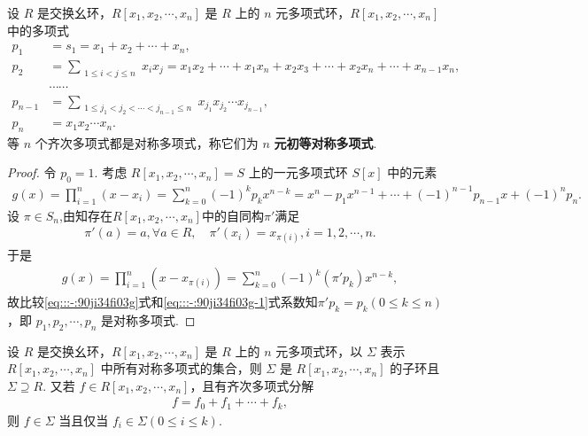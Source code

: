 \documentclass[../../main.tex]{subfiles}%
\begin{document}
\begin{lemma}\label{lemma:抽象代数--引理2.3.1}
设 \( R \) 是交换幺环，\( R[x_1, x_2, \cdots, x_n] \) 是 \( R \) 上的 \( n \) 元多项式环，\( R[x_1, x_2, \cdots, x_n] \) 中的多项式
\begin{align*}
p_1 &= s_1 = x_1 + x_2 + \cdots + x_n, \\
p_2 &= \sum_{\substack{1 \leqslant i < j \leqslant n}} x_i x_j = x_1 x_2 + \cdots + x_1 x_n + x_2 x_3 + \cdots + x_2 x_n + \cdots + x_{n-1} x_n, \\
&\cdots\cdots \\
p_{n-1} &= \sum_{\substack{1 \leqslant j_1 < j_2 < \cdots < j_{n-1} \leqslant n}} x_{j_1} x_{j_2} \cdots x_{j_{n-1}} , \\
p_n &= x_1 x_2 \cdots x_n.
\end{align*}
等 \( n \) 个齐次多项式都是对称多项式，称它们为 \( n \) \textbf{元初等对称多项式}.
\end{lemma}
\begin{proof}
令 \( p_0 = 1 \). 考虑 \( R[x_1, x_2, \cdots, x_n] = S \) 上的一元多项式环 \( S[x] \) 中的元素
\begin{align}\label{eq:::-:90ji34fi03g}
g(x) = \prod_{i=1}^n (x - x_i) = \sum_{k=0}^n (-1)^k p_k x^{n - k} = x^n - p_1 x^{n - 1} + \cdots + (-1)^{n - 1} p_{n - 1} x + (-1)^n p_n.
\end{align}
设 \( \pi \in S_n \),由知存在$R[x_1,x_2,\cdots,x_n]$中的自同构$\pi'$满足
\begin{align*}
\pi'(a) = a, \forall a \in R, \quad \pi'(x_i) = x_{\pi(i)}, i = 1, 2, \cdots, n.
\end{align*}
于是
\begin{align}\label{eq:::-:90ji34fi03g-1}
g(x) = \prod_{i=1}^n (x - x_{\pi(i)}) = \sum_{k=0}^n (-1)^k (\pi' p_k) x^{n - k},
\end{align}
故比较\eqref{eq:::-:90ji34fi03g}式和\eqref{eq:::-:90ji34fi03g-1}式系数知\( \pi' p_k = p_k (0 \leqslant k \leqslant n) \)，即 \( p_1, p_2, \cdots, p_n \) 是对称多项式.
\end{proof}

\begin{lemma}\label{lemma:抽象代数--引理2.3.2}
设 \( R \) 是交换幺环，\( R[x_1, x_2, \cdots, x_n] \) 是 \( R \) 上的 \( n \) 元多项式环，以 \( \Sigma \) 表示 \( R[x_1, x_2, \cdots, x_n] \) 中所有对称多项式的集合，则 \( \Sigma \) 是 \( R[x_1, x_2, \cdots, x_n] \) 的子环且 \( \Sigma \supseteq R \). 又若 \( f \in R[x_1, x_2, \cdots, x_n] \)，且有齐次多项式分解
\begin{align*}
f = f_0 + f_1 + \cdots + f_k,
\end{align*}
则 \( f \in \Sigma \) 当且仅当 \( f_i \in \Sigma (0 \leqslant i \leqslant k) \).
\end{lemma}
\end{document}
